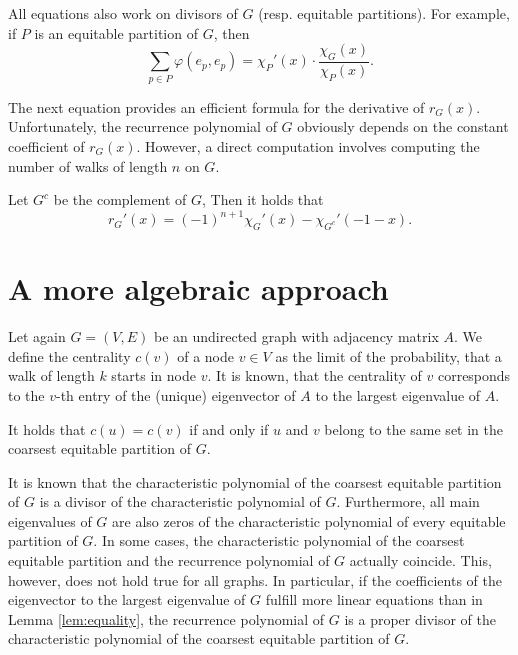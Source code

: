 \documentclass[a4paper,12pt]{article}
\begin{document}
\begin{remark}
All equations also work on divisors of $G$ (resp. equitable partitions). For example, if $P$ is an equitable partition of $G$, then
$$
\sum_{p\in P}\varphi(e_p,e_p) = \chi_P'(x) \cdot \frac{\chi_G(x)}{\chi_P(x)}.
$$
\end{remark}

The next equation provides an efficient formula for the derivative of $r_G(x)$. Unfortunately, the recurrence polynomial of $G$ obviously depends on the constant coefficient of $r_G(x)$. However, a direct computation involves computing the number of walks of length $n$ on $G$.

\begin{lemma}
Let $G^c$ be the complement of $G$, Then it holds that
$$
r_G'(x) = (-1)^{n+1}\chi_G'(x) - \chi_{G^c}'(-1-x).
$$
\end{lemma}

\section{A more algebraic approach}

Let again $G=(V,E)$ be an undirected graph with adjacency matrix $A$. We define the centrality $c(v)$ of a node $v\in V$ as the limit of the probability, that a walk of length $k$ starts in node $v$. It is known, that the centrality of $v$ corresponds to the $v$-th entry of the (unique) eigenvector of $A$ to the largest eigenvalue of $A$.

\begin{lemma}\label{lem:equality}
It holds that $c(u) = c(v)$ if and only if $u$ and $v$ belong to the same set in the coarsest equitable partition of $G$.
\end{lemma}

It is known that the characteristic polynomial of the coarsest equitable partition of $G$ is a divisor of the characteristic polynomial of $G$. Furthermore, all main eigenvalues of $G$ are also zeros of the characteristic polynomial of every equitable partition of $G$. In some cases, the characteristic polynomial of the coarsest equitable partition and the recurrence polynomial of $G$ actually coincide. This, however, does not hold true for all graphs. In particular, if the coefficients of the eigenvector to the largest eigenvalue of $G$ fulfill more linear equations than in Lemma \ref{lem:equality}, the recurrence polynomial of $G$ is a proper divisor of the characteristic polynomial of the coarsest equitable partition of $G$.
\end{document}
